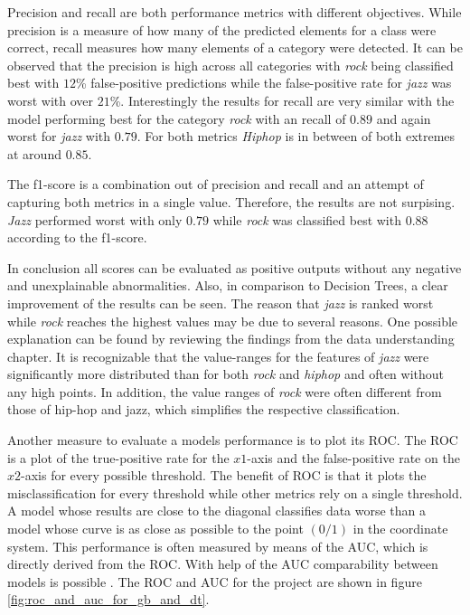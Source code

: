 Precision and recall are both performance metrics with different objectives. While precision is a measure of how many of the 
predicted elements for a class were correct, recall measures how many elements of a category were detected. It can be observed that 
the precision is high across all categories with \emph{rock} being classified best with \(12\)\% false-positive predictions while 
the false-positive rate for \emph{jazz} was worst with over \(21\)\%. Interestingly the results for recall are very similar with the model 
performing best for the category \emph{rock} with an recall of \(0.89\) and again worst for \emph{jazz} with \(0.79\). For both metrics \emph{Hiphop} is in
between of both extremes at around \(0.85\). 

The f1-score is a combination out of precision and recall and an attempt of capturing both metrics in a single value. Therefore,
the results are not surpising. \emph{Jazz} performed worst with only \(0.79\) while \emph{rock} was classified best with \(0.88\) according to the 
f1-score. 

In conclusion all scores can be evaluated as positive outputs without any negative and unexplainable abnormalities. Also, in comparison 
to Decision Trees, a clear improvement of the results can be seen. The reason that \emph{jazz} is ranked worst while \emph{rock} reaches the 
highest values may be due to several reasons. One possible explanation can be found by reviewing the findings from the data 
understanding chapter. It is recognizable that the value-ranges for the features of \emph{jazz} were significantly more distributed 
than for both \emph{rock} and \emph{hiphop} and often without any high points. In addition, the value ranges of \emph{rock} were often different from 
those of hip-hop and jazz, which simplifies the respective classification. 

Another measure to evaluate a models performance is to plot its \ac{ROC}. The \ac{ROC} is a plot of the true-positive
rate for the \(x1\)-axis and the false-positive rate on the \(x2\)-axis for every possible threshold. The benefit of \ac{ROC} is that it plots the 
misclassification for every threshold while other metrics rely on a single threshold. A model whose results are close to the diagonal classifies data worse than a 
model whose curve is as close as possible to the point \((0/1)\) in the coordinate system. This performance is often measured by means of 
the \ac{AUC}, which is directly derived from the \ac{ROC}. With help of the \ac{AUC} comparability between models is possible \cite[p.862f]{fawcett2006introduction} \cite{scikit-roc_and_auc}. 
The \ac{ROC} and \ac{AUC} for the project are shown in figure \ref{fig:roc_and_auc_for_gb_and_dt}. 

